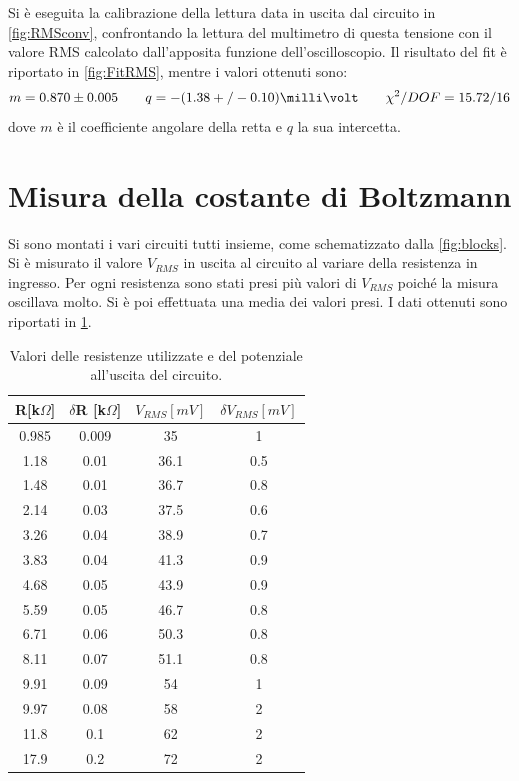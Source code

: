\documentclass[a4paper,10pt]{article}
\begin{document}
Si è eseguita la calibrazione della lettura data in uscita dal circuito in \cref{fig:RMSconv}, confrontando la lettura del multimetro di questa tensione con il valore RMS calcolato dall'apposita funzione dell'oscilloscopio.
Il risultato del fit è riportato in \cref{fig:FitRMS}, mentre i valori ottenuti sono:
\[ m = 0.870 \pm 0.005	\qquad	q = -(1.38+/-0.10) \milli\volt	\qquad	\chi^2/DOF = 15.72 / 16 \]
dove $ m $ è il coefficiente angolare della retta e $ q $ la sua intercetta.


\section{Misura della costante di Boltzmann}
\vspace*{-5pt}
Si sono montati i vari circuiti tutti insieme, come schematizzato dalla \cref{fig:blocks}. Si è misurato il valore $V_{RMS}$ in uscita al circuito al variare della resistenza in ingresso. Per ogni resistenza sono stati presi più valori di $V_{RMS}$ poiché la misura oscillava molto. Si è poi effettuata una media dei valori presi. I dati ottenuti sono riportati in \cref{tab:lastfitav}.
\vspace*{-10pt}
\begin{table}[H]
	\centering
	\begin{tabular}{cccc}
		\hline
		R[k$\Omega$] & $\delta$R [k$\Omega$] & $V_{RMS}[mV]$  & $\delta$$V_{RMS}[mV]$ \\
		\hline
		0.985 & 0.009 & 35 & 1 \\
		1.18 & 0.01 & 36.1 & 0.5 \\
		1.48 & 0.01 & 36.7 & 0.8 \\
		2.14 & 0.03 & 37.5 & 0.6 \\
		3.26 & 0.04 & 38.9 & 0.7 \\
		3.83 & 0.04 & 41.3 & 0.9 \\
		4.68 & 0.05 & 43.9 & 0.9 \\
		5.59 & 0.05 & 46.7 & 0.8 \\
		6.71 & 0.06 & 50.3 & 0.8 \\
		8.11 & 0.07 & 51.1 & 0.8 \\
		9.91 & 0.09 & 54 & 1 \\
		9.97 & 0.08 & 58 & 2 \\
		11.8 & 0.1 & 62 & 2 \\
		17.9 & 0.2 & 72 & 2 \\
		\hline
	\end{tabular}
	\caption{Valori delle resistenze utilizzate e del potenziale all'uscita del circuito.}
	\label{tab:lastfitav}
\end{table}
\end{document}

